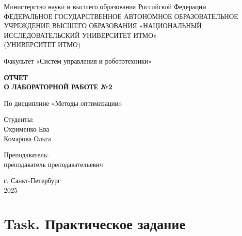 \documentclass[a4paper,12pt]{article}
\begin{document}
	\begin{titlepage}
		\centering
		\vspace*{1cm}
		
		{\large Министерство науки и высшего образования Российской Федерации}\\
		{\large ФЕДЕРАЛЬНОЕ ГОСУДАРСТВЕННОЕ АВТОНОМНОЕ ОБРАЗОВАТЕЛЬНОЕ УЧРЕЖДЕНИЕ ВЫСШЕГО ОБРАЗОВАНИЯ «НАЦИОНАЛЬНЫЙ ИССЛЕДОВАТЕЛЬСКИЙ УНИВЕРСИТЕТ ИТМО»}\\
		{\large (УНИВЕРСИТЕТ ИТМО)}\\
		
		\vspace{2cm}
		
		{\large Факультет «Систем управления и робототехники»}\\
		
		\vspace{3cm}
		
		\textbf{{\Huge ОТЧЕТ}\\
			{\Huge О ЛАБОРАТОРНОЙ РАБОТЕ №2}}\\
		
		\vspace{1cm}
		
		{\LARGE По дисциплине «Методы оптимизации»}\\
		
		\vspace{2cm}
		
		{\Large Студенты:}\\
		Охрименко Ева \\
		Комарова Ольга \\
		
		\vspace{2cm}
		
		{\Large Преподаватель:}\\
		преподаватель преподавательевич\\
		
		\vspace{4cm}
		
		{\large г. Санкт-Петербург}\\
		{\large 2025}
		
	\end{titlepage} 
	
	\tableofcontents  %
	\newpage
	
	
	
	
\section{Task. Практическое задание}
\end{document}
